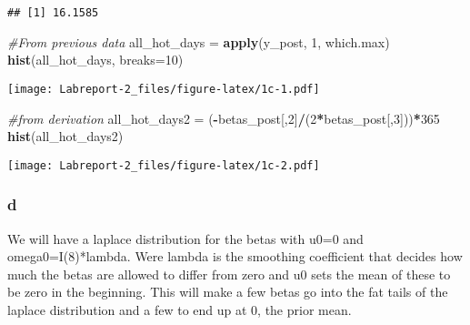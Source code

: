 \documentclass[]{article}
\newenvironment{Shaded}{\begin{snugshade}}{\end{snugshade}}
\newcommand{\CommentTok}[1]{\textcolor[rgb]{0.56,0.35,0.01}{\textit{#1}}}
\newcommand{\DataTypeTok}[1]{\textcolor[rgb]{0.13,0.29,0.53}{#1}}
\newcommand{\DecValTok}[1]{\textcolor[rgb]{0.00,0.00,0.81}{#1}}
\newcommand{\KeywordTok}[1]{\textcolor[rgb]{0.13,0.29,0.53}{\textbf{#1}}}
\newcommand{\NormalTok}[1]{#1}
\newcommand{\OperatorTok}[1]{\textcolor[rgb]{0.81,0.36,0.00}{\textbf{#1}}}
\newcommand{\StringTok}[1]{\textcolor[rgb]{0.31,0.60,0.02}{#1}}
\begin{document}
\begin{verbatim}
## [1] 16.1585
\end{verbatim}

\begin{Shaded}
\begin{Highlighting}[]
\CommentTok{#From previous data}
\NormalTok{all_hot_days =}\StringTok{ }\KeywordTok{apply}\NormalTok{(y_post, }\DecValTok{1}\NormalTok{, which.max)}
\KeywordTok{hist}\NormalTok{(all_hot_days, }\DataTypeTok{breaks=}\DecValTok{10}\NormalTok{)}
\end{Highlighting}
\end{Shaded}

\texttt{[image: Labreport-2\_files/figure-latex/1c-1.pdf]}

\begin{Shaded}
\begin{Highlighting}[]
\CommentTok{#from derivation}
\NormalTok{all_hot_days2 =}\StringTok{ }\NormalTok{(}\OperatorTok{-}\NormalTok{betas_post[,}\DecValTok{2}\NormalTok{]}\OperatorTok{/}\NormalTok{(}\DecValTok{2}\OperatorTok{*}\NormalTok{betas_post[,}\DecValTok{3}\NormalTok{]))}\OperatorTok{*}\DecValTok{365}
\KeywordTok{hist}\NormalTok{(all_hot_days2)}
\end{Highlighting}
\end{Shaded}

\texttt{[image: Labreport-2\_files/figure-latex/1c-2.pdf]}

\hypertarget{d}{%
\subsubsection{d}\label{d}}

We will have a laplace distribution for the betas with u0=0 and
omega0=I(8)*lambda. Were lambda is the smoothing coefficient that
decides how much the betas are allowed to differ from zero and u0 sets
the mean of these to be zero in the beginning. This will make a few
betas go into the fat tails of the laplace distribution and a few to end
up at 0, the prior mean.
\end{document}
